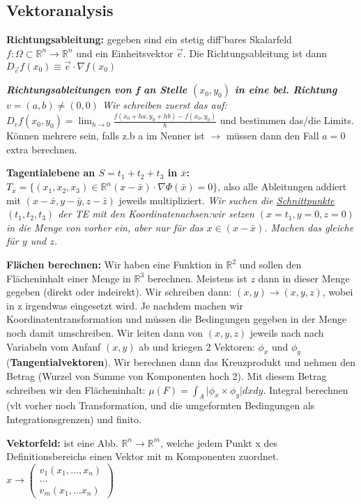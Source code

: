\documentclass[a3paper, ngerman, 8pt]{article}
\begin{document}
\begin{multicols*}{3}
\subsection*{Vektoranalysis}
\textbf{Richtungsableitung:} gegeben sind ein stetig diff'bares Skalarfeld 
$ f: \Omega \subset \mathbb{R}^n \to \mathbb{R}^n$ und ein Einheitsvektor 
$\vec{e}$. Die Richtungsableitung ist dann $D_{\vec{e}}f(x_0)\equiv\vec{e} \cdot \nabla f(x_0)$

\textit{\textbf{Richtungsableitungen von f an Stelle $(x_0,y_0)$ in eine bel. Richtung $v=(a,b)\neq (0,0)$} Wir schreiben zuerst das auf: $D_vf(x_0, y_0)=\lim_{h \to 0}\frac{f(x_0+ha, y_0+hb)-f(x_0, y_0)}{h}$} und bestimmen das/die Limits. Können mehrere sein, falls z.b a im Nenner ist $\to$ müssen dann den Fall $a=0$ extra berechnen. 

\textbf{Tagentialebene an $S=t_1+t_2+t_3$  in $\bar{x}$:} $T_{\bar{x}} = \{(x_1, x_2, x_3)\in \mathbb{R}^n (x-\bar{x})\cdot \nabla \Phi(\bar{x})=0\}$, also alle Ableitungen addiert mit $ (x-\bar{x}, y-\bar{y}, z-\bar{z})$ jeweils multipliziert. \textit{Wir suchen die \underline{Schnittpunkte $(t_1, t_2, t_3)$} der TE mit den Koordinatenachsen:wir setzen $(x=t_1, y=0, z=0)$ in die Menge von vorher ein, aber nur für das $x\in(x-\bar{x})$. Machen das gleiche für $y$ und $z$. }

\textbf{Flächen berechnen:} Wir haben eine Funktion in $\mathbb{R}^2$ und sollen den Flächeninhalt einer Menge in $\mathbb{R}^3$ berechnen. Meistens ist $z$ dann in dieser Menge gegeben (direkt oder indeirekt). Wir schreiben dann: $(x,y) \to (x,y,z)$, wobei in z irgendwas eingesetzt wird. Je nachdem machen wir Koordinatentransformation und müssen die Bedingungen gegeben in der Menge noch damit umschreiben. Wir leiten dann von $(x,y,z)$ jeweils nach nach Variabeln vom Anfanf $(x,y)$ ab und kriegen 2 Vektoren: $\phi_x$ und $\phi_y$ (\textbf{Tangentialvektoren}). Wir berechnen dann das Kreuzprodukt und nehmen den Betrag (Wurzel von Summe von Komponenten hoch 2). Mit diesem Betrag schreiben wir den Flächeninhalt: $\mu (F)= \int_{A} \vert \phi_x \times \phi_y \vert dxdy$. Integral berechnen (vlt vorher noch Transformation, und die umgeformten Bedingungen als Integrationsgrenzen) und finito.

\textbf{Vektorfeld:} ist eine Abb. $\mathbb{R}^n \to \mathbb{R}^m$, welche jedem Punkt x des Definitionsbereichs einen Vektor mit m Komponenten zuordnet. $x \to \begin{pmatrix}
v_1(x_1, ..., x_n) \\
...\\
v_m(x_1, ... x_n)
\end{pmatrix}$


\end{multicols*}
\end{document}
